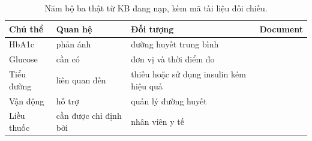 \par\FloatBarrier\begin{table}[H]\centering\small{}\setlength{\tabcolsep}{5pt}
\caption{Năm bộ ba thật từ KB đang nạp, kèm mã tài liệu đối chiếu.}\begin{tabular}{P{3.4cm}P{3.2cm}P{3.7cm}P{3cm}}\toprule
Chủ thể & Quan hệ & Đối tượng & Document\\\midrule
HbA1c & phản ánh & đường huyết trung bình & \\
Glucose & cần có & đơn vị và thời điểm đo & \\
Tiểu đường & liên quan đến & thiếu hoặc sử dụng insulin kém hiệu quả & \\
Vận động & hỗ trợ & quản lý đường huyết & \\
Liều thuốc & cần được chỉ định bởi & nhân viên y tế & \\\bottomrule\end{tabular}\end{table}
